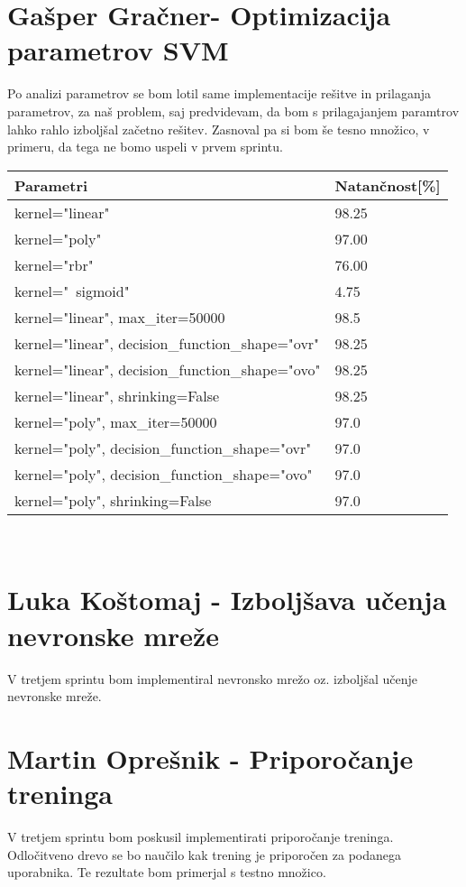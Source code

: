 \documentclass[a4paper,11pt]{article}
\begin{document}
\newpage
\section{Gašper Gračner- Optimizacija parametrov SVM}
Po analizi parametrov se bom lotil same implementacije rešitve in prilaganja parametrov, za naš problem, saj predvidevam, da bom s prilagajanjem paramtrov lahko rahlo izboljšal začetno rešitev. Zasnoval pa si bom še tesno množico, v primeru, da tega ne bomo uspeli v prvem sprintu.\\

\begin{tabu} to 0.8\textwidth { || X[l] | X[c] || }
 \hline
 Parametri & Natančnost[\%] \\
 \hline
 \hline
 kernel="linear"  & 98.25   \\
 \hline
 kernel="poly"  & 97.00   \\
 \hline
 kernel="rbr"  & 76.00   \\
 \hline
 kernel="\ sigmoid"  & 4.75   \\
 \hline
 kernel="linear", max_iter=50000  & 98.5  \\
 \hline
 kernel="linear", decision_function_shape="ovr"  & 98.25  \\
 \hline
 kernel="linear", decision_function_shape="ovo"  & 98.25  \\
 \hline
 kernel="linear", shrinking=False & 98.25  \\
 \hline
 kernel="poly", max_iter=50000  & 97.0  \\
 \hline
 kernel="poly", decision_function_shape="ovr"  & 97.0  \\
 \hline
 kernel="poly", decision_function_shape="ovo"  & 97.0  \\
 \hline
 kernel="poly", shrinking=False & 97.0  \\
\hline
\end{tabu}

\

\section{Luka Koštomaj - Izboljšava učenja nevronske mreže}

V tretjem sprintu bom implementiral nevronsko mrežo oz. izboljšal učenje nevronske mreže.

\section{Martin Oprešnik - Priporočanje treninga }

V tretjem sprintu bom poskusil implementirati priporočanje treninga. Odločitveno drevo se bo naučilo kak trening je priporočen za podanega uporabnika. Te rezultate bom primerjal s testno množico. 
\end{document}
